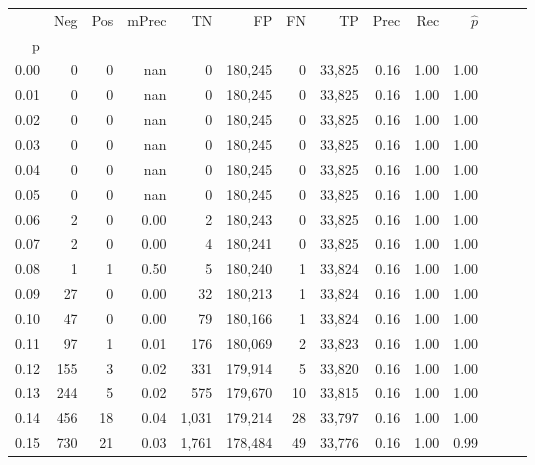 \begin{tabular}{rrrrrrrrrrrrrr}
\toprule
{} &    Neg &  Pos & mPrec &       TN &       FP &      FN &      TP &  Prec &   Rec & $\hat{p}$ \\
p    &        &      &       &          &          &         &         &       &       &           \\
\midrule
0.00 &      0 &    0 &   nan &        0 &  180,245 &       0 &  33,825 &  0.16 &  1.00 &      1.00 \\
0.01 &      0 &    0 &   nan &        0 &  180,245 &       0 &  33,825 &  0.16 &  1.00 &      1.00 \\
0.02 &      0 &    0 &   nan &        0 &  180,245 &       0 &  33,825 &  0.16 &  1.00 &      1.00 \\
0.03 &      0 &    0 &   nan &        0 &  180,245 &       0 &  33,825 &  0.16 &  1.00 &      1.00 \\
0.04 &      0 &    0 &   nan &        0 &  180,245 &       0 &  33,825 &  0.16 &  1.00 &      1.00 \\
0.05 &      0 &    0 &   nan &        0 &  180,245 &       0 &  33,825 &  0.16 &  1.00 &      1.00 \\
0.06 &      2 &    0 &  0.00 &        2 &  180,243 &       0 &  33,825 &  0.16 &  1.00 &      1.00 \\
0.07 &      2 &    0 &  0.00 &        4 &  180,241 &       0 &  33,825 &  0.16 &  1.00 &      1.00 \\
0.08 &      1 &    1 &  0.50 &        5 &  180,240 &       1 &  33,824 &  0.16 &  1.00 &      1.00 \\
0.09 &     27 &    0 &  0.00 &       32 &  180,213 &       1 &  33,824 &  0.16 &  1.00 &      1.00 \\
0.10 &     47 &    0 &  0.00 &       79 &  180,166 &       1 &  33,824 &  0.16 &  1.00 &      1.00 \\
0.11 &     97 &    1 &  0.01 &      176 &  180,069 &       2 &  33,823 &  0.16 &  1.00 &      1.00 \\
0.12 &    155 &    3 &  0.02 &      331 &  179,914 &       5 &  33,820 &  0.16 &  1.00 &      1.00 \\
0.13 &    244 &    5 &  0.02 &      575 &  179,670 &      10 &  33,815 &  0.16 &  1.00 &      1.00 \\
0.14 &    456 &   18 &  0.04 &    1,031 &  179,214 &      28 &  33,797 &  0.16 &  1.00 &      1.00 \\
0.15 &    730 &   21 &  0.03 &    1,761 &  178,484 &      49 &  33,776 &  0.16 &  1.00 &      0.99 \\

\end{tabular}
